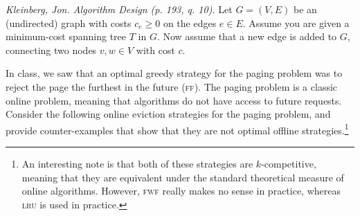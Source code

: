 \documentclass[solutionorbox,answers]{exam}
\begin{document}
\begin{questions}
\begin{solutionbox}{}
  
\end{solutionbox}

\newpage

\question \textit{Kleinberg, Jon. Algorithm Design (p. 193, q. 10).} Let $G = (V , E)$ be an (undirected) graph with costs $c_e \ge 0$ on the edges $e \in E$.
Assume you are given a minimum-cost spanning tree $T$ in $G$. Now assume
that a new edge is added to $G$, connecting two nodes $v, w \in V$ with cost $c$.


\newpage

\question

In class, we saw that an optimal greedy strategy for the paging problem was to reject the page the furthest in the future (\textsc{ff}). The paging problem is a classic online problem, meaning that algorithms do not have access to future requests. Consider the following online eviction strategies for the paging problem, and provide counter-examples that show that they are not optimal offline strategies.\footnote{An interesting note is that both of these strategies are $k$-competitive, meaning that they are equivalent under the standard theoretical measure of online algorithms. However, \textsc{fwf} really makes no sense in practice, whereas \textsc{lru} is used in practice.}


\end{questions}
\end{document}
